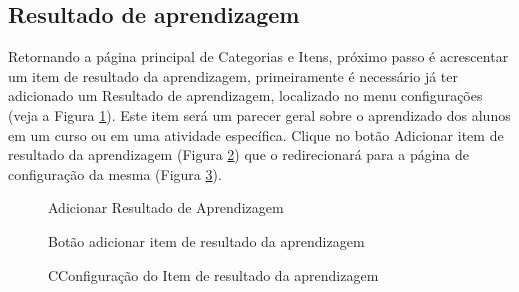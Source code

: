 \subsection{Resultado de aprendizagem}

Retornando a página principal de Categorias e Itens, próximo passo é acrescentar um item de resultado da aprendizagem, primeiramente é necessário já ter adicionado um Resultado de aprendizagem, localizado no menu configurações (veja a Figura \ref{fig:cap6_21}). Este item será um parecer geral sobre o aprendizado dos alunos em um curso ou em uma atividade específica. Clique no botão Adicionar item de resultado da aprendizagem (Figura \ref{fig:cap6_22}) que o redirecionará para a página de configuração da mesma (Figura \ref{fig:cap6_23}).

\begin{figure}[htbp]
 \begin{center}
  \caption{Adicionar Resultado de Aprendizagem}
  \label{fig:cap6_21}
 \end{center}
\end{figure}
\begin{figure}[htbp]
 \begin{center}
  \caption{Botão adicionar item de resultado da aprendizagem}
  \label{fig:cap6_22}
 \end{center}
\end{figure}
\begin{figure}[htbp]
 \begin{center}
  \caption{CConfiguração do Item de resultado da aprendizagem}
  \label{fig:cap6_23}
 \end{center}
\end{figure}

